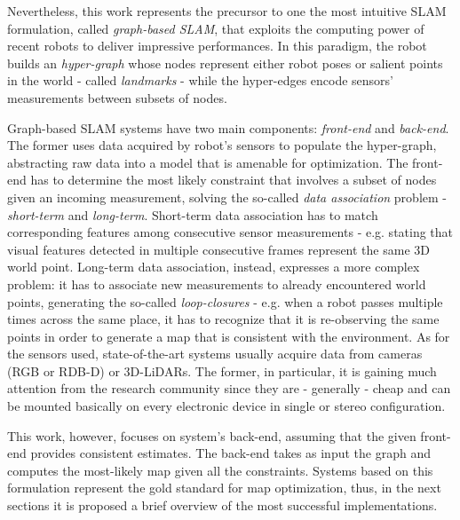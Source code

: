 Nevertheless, this work represents the precursor to one the most intuitive SLAM formulation, called \textit{graph-based SLAM}, that exploits the computing power of recent robots to deliver impressive performances. In this paradigm, the robot builds an \textit{hyper-graph} whose nodes represent either robot poses or salient points in the world - called \textit{landmarks} - while the hyper-edges encode sensors' measurements between subsets of nodes. 

Graph-based SLAM systems have two main components: \textit{front-end} and \textit{back-end}. The former uses data acquired by robot's sensors to populate the hyper-graph, abstracting raw data into a model that is amenable for optimization. The front-end has to determine the most likely constraint that involves a subset of nodes given an incoming measurement, solving the so-called \textit{data association} problem - \textit{short-term} and \textit{long-term}. Short-term data association has to match corresponding features among consecutive sensor measurements - e.g. stating that visual features detected in multiple consecutive frames represent the same 3D world point. Long-term data association, instead, expresses a more complex problem: it has to associate new measurements to already encountered world points, generating the so-called \textit{loop-closures} - e.g. when a robot passes multiple times across the same place, it has to recognize that it is re-observing the same points in order to generate a map that is consistent with the environment. As for the sensors used, state-of-the-art systems usually acquire data from cameras (RGB or RDB-D) or 3D-LiDARs. The former, in particular, it is gaining much attention from the research community since they are - generally - cheap and can be mounted basically on every electronic device in single or stereo configuration. 

This work, however, focuses on system's back-end, assuming that the given front-end provides consistent estimates. The back-end takes as input the graph and computes the most-likely map given all the constraints. Systems based on this formulation represent the gold standard for map optimization, thus, in the next sections it is proposed a brief overview of the most successful implementations.

